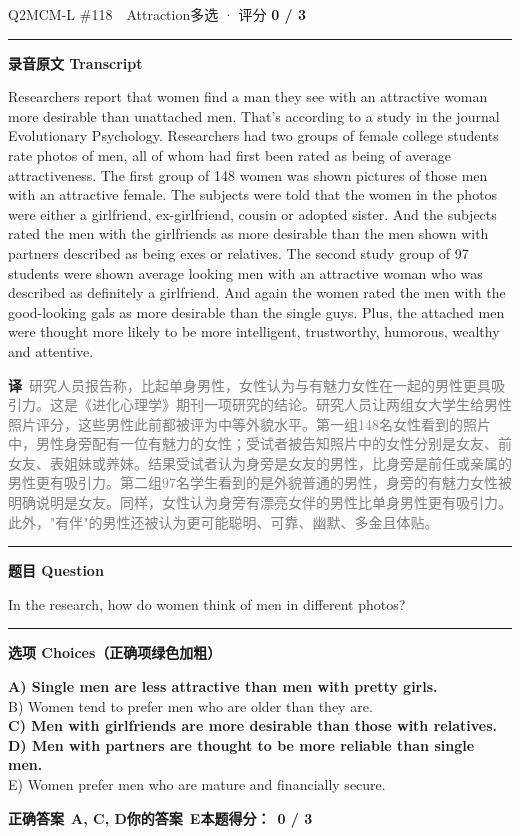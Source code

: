 \documentclass[11pt]{article}
\newcommand{\ptesub}[1]{%
  \par\needspace{2\baselineskip}\smallskip
  {\color{cAccent}\rule[-0.2ex]{3pt}{1.05em}}\hspace{6pt}%
  {\bfseries\color{cHead}#1}\par\nopagebreak\smallskip}
\newcommand{\zh}[1]{{\footnotesize\textcolor{cNote}{\textbf{译}}\ \textcolor{gray}{#1}}}
\begin{document}
\begin{qblock}{Q2\quad MCM-L \#118\ \ Attraction}{多选 · 评分 \textcolor{cAccent}{\bfseries 0 / 3}}
\ptesub{录音原文 Transcript}
\begin{promptbox}
Researchers report that women find a man they see with an attractive woman more desirable than unattached men. That's according to a study in the journal Evolutionary Psychology. Researchers had two groups of female college students rate photos of men, all of whom had first been rated as being of average attractiveness. The first group of 148 women was shown pictures of those men with an attractive female. The subjects were told that the women in the photos were either a girlfriend, ex-girlfriend, cousin or adopted sister. And the subjects rated the men with the girlfriends as more desirable than the men shown with partners described as being exes or relatives. The second study group of 97 students were shown average looking men with an attractive woman who was described as definitely a girlfriend. And again the women rated the men with the good-looking gals as more desirable than the single guys. Plus, the attached men were thought more likely to be more intelligent, trustworthy, humorous, wealthy and attentive.
\end{promptbox}
\zh{研究人员报告称，比起单身男性，女性认为与有魅力女性在一起的男性更具吸引力。这是《进化心理学》期刊一项研究的结论。研究人员让两组女大学生给男性照片评分，这些男性此前都被评为中等外貌水平。第一组148名女性看到的照片中，男性身旁配有一位有魅力的女性；受试者被告知照片中的女性分别是女友、前女友、表姐妹或养妹。结果受试者认为身旁是女友的男性，比身旁是前任或亲属的男性更有吸引力。第二组97名学生看到的是外貌普通的男性，身旁的有魅力女性被明确说明是女友。同样，女性认为身旁有漂亮女伴的男性比单身男性更有吸引力。此外，"有伴"的男性还被认为更可能聪明、可靠、幽默、多金且体贴。}
\ptesub{题目 Question}
\begin{notebox}In the research, how do women think of men in different photos?\end{notebox}
\ptesub{选项 Choices（正确项绿色加粗）}
{\small
{\color{cFix}\textbf{A) Single men are less attractive than men with pretty girls.}}\\
B) Women tend to prefer men who are older than they are.\\
{\color{cFix}\textbf{C) Men with girlfriends are more desirable than those with relatives.}}\\
{\color{cFix}\textbf{D) Men with partners are thought to be more reliable than single men.}}\\
E) Women prefer men who are mature and financially secure.}
\par\smallskip
\textbf{正确答案}\ \textcolor{cFix}{\bfseries A, C, D}\qquad\textbf{你的答案}\ {\color{cWrong}\bfseries E}\qquad\textbf{本题得分：}\ {\color{cAccent}\bfseries 0 / 3}
\end{qblock}
\end{document}
